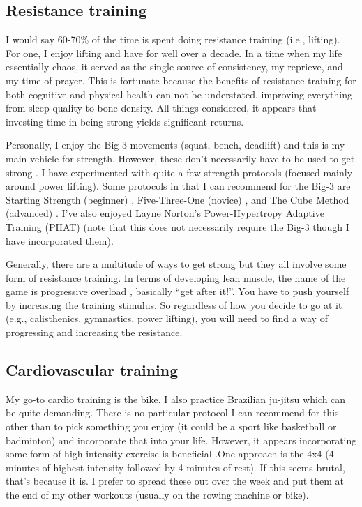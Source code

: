 \documentclass[10pt,twocolumn]{extarticle}
\begin{document}
\subsection{Resistance training}
I would say 60-70\% of the time is spent doing resistance training (i.e., lifting). For one, I enjoy lifting and have for well over a decade. In a time when my life essentially chaos, it served as the single source of consistency, my reprieve, and  my time of prayer. This is fortunate because the benefits of resistance training for both cognitive \cite{chow2021central} and physical health \cite{shailendra2022resistance} can not be understated, improving everything from sleep quality to bone density. All things considered, it appears that investing time in being strong yields significant returns. 

Personally, I enjoy the Big-3 movements (squat, bench, deadlift) and this is my main vehicle for strength. However, these don't necessarily have to be used to get strong \cite{huberman2023fitness}. I have experimented with quite a few strength protocols (focused mainly around power lifting). Some protocols in that I can recommend for the Big-3 are Starting Strength (beginner) \cite{rippetoe2017starting}, Five-Three-One (novice) \cite{wendler20115}, and The Cube Method (advanced) \cite{bugera2023cube}. I've also enjoyed Layne Norton's Power-Hypertropy Adaptive Training (PHAT) \cite{norton2024phat} (note that this does not necessarily require the Big-3 though I have incorporated them). 

Generally, there are a multitude of ways to get strong but they all involve some form of resistance training. In terms of developing lean muscle, the name of the game is progressive overload \cite{baker2016,plotkin2022progressive}, basically ``get after it!''. You have to push yourself by increasing the training stimulus. So regardless of how you decide to go at it (e.g., calisthenics, gymnastics, power lifting), you will need to find a way of progressing and increasing the resistance.

\subsection{Cardiovascular training}
My go-to cardio training is the bike. I also practice Brazilian ju-jitsu which can be quite demanding. There is no particular protocol I can recommend for this other than to pick something you enjoy (it could be a sport like basketball or badminton) and incorporate that into your life. However, it appears incorporating some form of high-intensity exercise is beneficial \cite{attia2022vo2max,attia2022zone5}.One approach is the 4x4 (4 minutes of highest intensity followed by 4 minutes of rest). If this seems brutal, that's because it is. I prefer to spread these out over the week and put them at the end of my other workouts (usually on the rowing machine or bike).
\end{document}

